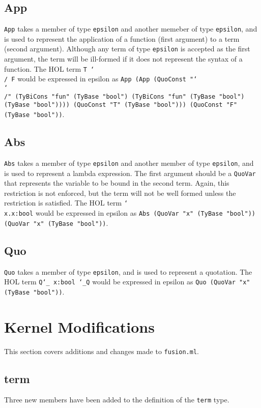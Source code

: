 \documentclass{article}
\def\c#1{\texttt{#1}}
\begin{document}
\subsection{App}
\c{App} takes a member of type \c{epsilon} and another memeber of type \c{epsilon}, and is used to represent the application of a function (first argument) to a term (second argument). Although any term of type \c{epsilon} is accepted as the first argument, the term will be ill-formed if it does not represent the syntax of a function. The HOL term \c{T \char`\\/ F} would be expressed in epsilon as \c{App (App (QuoConst "\char`\\\char`\\/" (TyBiCons "fun" (TyBase "bool") (TyBiCons "fun" (TyBase "bool") (TyBase "bool")))) (QuoConst "T" (TyBase "bool"))) (QuoConst "F" (TyBase "bool"))}. 

\subsection{Abs}
\c{Abs} takes a member of type \c{epsilon} and another member of type \c{epsilon}, and is used to represent a lambda expression. The first argument should be a \c{QuoVar} that represents the variable to be bound in the second term. Again, this restriction is not enforced, but the term will not be well formed unless the restriction is satisfied. The HOL term \c{\char`\\x.x:bool} would be expressed in epsilon as \c{Abs (QuoVar "x" (TyBase "bool")) (QuoVar "x" (TyBase "bool"))}.

\subsection{Quo}
\c{Quo} takes a member of type \c{epsilon}, and is used to represent a quotation. The HOL term \c{Q\char`\_  x:bool \char`\_Q} would be expressed in epsilon as \c{Quo (QuoVar "x" (TyBase "bool"))}.

\newpage

\section{Kernel Modifications}
This section covers additions and changes made to \c{fusion.ml}.

\subsection{term}
Three new members have been added to the definition of the \c{term} type.
\end{document}
